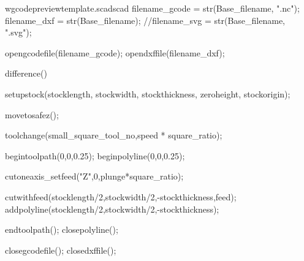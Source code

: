 \documentclass{ltxdoc}
\begin{document}
\begin{writecode}{w}{gcodepreviewtemplate.scad}{scad}
filename_gcode = str(Base_filename, ".nc");
filename_dxf = str(Base_filename);
//filename_svg = str(Base_filename, ".svg");

opengcodefile(filename_gcode);
opendxffile(filename_dxf);

difference() {
setupstock(stocklength, stockwidth, stockthickness, zeroheight, stockorigin);

movetosafez();

toolchange(small_square_tool_no,speed * square_ratio);

begintoolpath(0,0,0.25);
beginpolyline(0,0,0.25);

cutoneaxis_setfeed("Z",0,plunge*square_ratio);

cutwithfeed(stocklength/2,stockwidth/2,-stockthickness,feed);
addpolyline(stocklength/2,stockwidth/2,-stockthickness);

endtoolpath();
closepolyline();
}

closegcodefile();
closedxffile();
\end{writecode}
\addtocounter{gcptmpl}{112}
 
\end{document}
